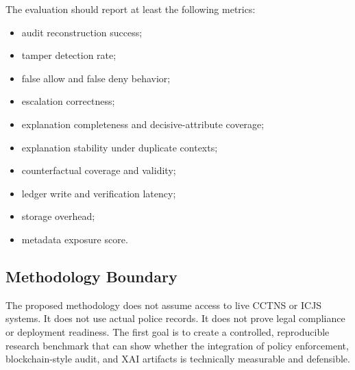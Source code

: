 The evaluation should report at least the following metrics:
\begin{itemize}
    \item audit reconstruction success;
    \item tamper detection rate;
    \item false allow and false deny behavior;
    \item escalation correctness;
    \item explanation completeness and decisive-attribute coverage;
    \item explanation stability under duplicate contexts;
    \item counterfactual coverage and validity;
    \item ledger write and verification latency;
    \item storage overhead;
    \item metadata exposure score.
\end{itemize}

\subsection{Methodology Boundary}

The proposed methodology does not assume access to live CCTNS or ICJS systems. It does not use actual police records. It does not prove legal compliance or deployment readiness. The first goal is to create a controlled, reproducible research benchmark that can show whether the integration of policy enforcement, blockchain-style audit, and XAI artifacts is technically measurable and defensible.
